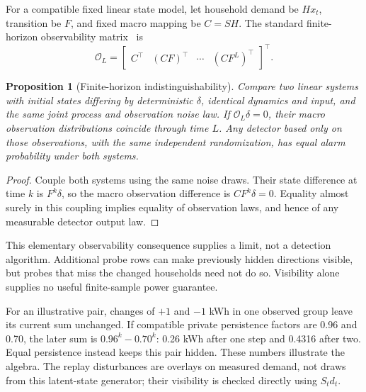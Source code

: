 \documentclass[conference]{IEEEtran}
\newtheorem{proposition}{Proposition}
\begin{document}
For a compatible fixed linear state model, let household demand be $Hx_t$, transition be $F$, and fixed macro mapping be $C=SH$. The standard finite-horizon observability matrix~\cite{hespanha} is
\begin{equation}
\mathcal O_L=\begin{bmatrix}C^\top&(CF)^\top&\cdots&(CF^L)^\top\end{bmatrix}^{\!\top}.
\end{equation}
\begin{proposition}[Finite-horizon indistinguishability]
Compare two linear systems with initial states differing by deterministic $\delta$, identical dynamics and input, and the same joint process and observation noise law. If $\mathcal O_L\delta=0$, their macro observation distributions coincide through time $L$. Any detector based only on those observations, with the same independent randomization, has equal alarm probability under both systems.
\end{proposition}
\begin{proof}
Couple both systems using the same noise draws. Their state difference at time $k$ is $F^k\delta$, so the macro observation difference is $CF^k\delta=0$. Equality almost surely in this coupling implies equality of observation laws, and hence of any measurable detector output law.
\end{proof}

This elementary observability consequence supplies a limit, not a detection algorithm. Additional probe rows can make previously hidden directions visible, but probes that miss the changed households need not do so. Visibility alone supplies no useful finite-sample power guarantee.

For an illustrative pair, changes of $+1$ and $-1$ kWh in one observed group leave its current sum unchanged. If compatible private persistence factors are 0.96 and 0.70, the later sum is $0.96^k-0.70^k$: 0.26 kWh after one step and 0.4316 after two. Equal persistence instead keeps this pair hidden. These numbers illustrate the algebra. The replay disturbances are overlays on measured demand, not draws from this latent-state generator; their visibility is checked directly using $S_t d_t$.
\end{document}

